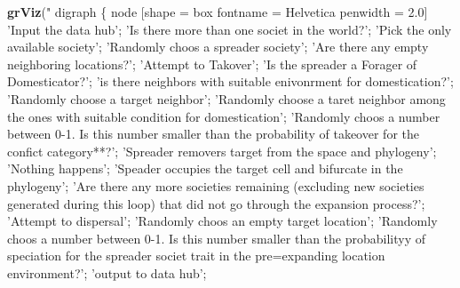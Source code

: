 \documentclass[]{book}
\newenvironment{Shaded}{\begin{snugshade}}{\end{snugshade}}
\newcommand{\KeywordTok}[1]{\textcolor[rgb]{0.13,0.29,0.53}{\textbf{{#1}}}}
\newcommand{\StringTok}[1]{\textcolor[rgb]{0.31,0.60,0.02}{{#1}}}
\newcommand{\NormalTok}[1]{{#1}}
\theoremstyle{definition}
\theoremstyle{definition}
\theoremstyle{remark}
\begin{document}
\begin{Shaded}
\begin{Highlighting}[]
\KeywordTok{grViz}\NormalTok{(}\StringTok{"}
\StringTok{  digraph \{}
\StringTok{    }
\StringTok{    node [shape = box}
\StringTok{          fontname = Helvetica}
\StringTok{          penwidth = 2.0]}
\StringTok{    'Input the data hub'; }
\StringTok{    'Is there more than one societ in the world?'; }
\StringTok{    'Pick the only available society';}
\StringTok{    'Randomly choos a spreader society';}
\StringTok{    'Are there any empty neighboring locations?';}
\StringTok{    'Attempt to Takover';}
\StringTok{    'Is the spreader a Forager of Domesticator?';}
\StringTok{    'is there neighbors with suitable enivonrment for domestication?';}
\StringTok{    'Randomly choose a target neighbor';}
\StringTok{    'Randomly choose a taret neighbor among the ones with suitable condition for domestication';}
\StringTok{    'Randomly choos a number between 0-1. Is this number smaller than the probability of takeover for the confict category**?';}
\StringTok{    'Spreader removers target from the space and phylogeny';}
\StringTok{    'Nothing happens';}
\StringTok{    'Speader occupies the target cell and bifurcate in the phylogeny';}
\StringTok{    'Are there any more societies remaining (excluding new societies generated during this loop) that did not go through the expansion process?';}
\StringTok{    'Attempt to dispersal';}
\StringTok{    'Randomly choos an empty target location';}
\StringTok{    'Randomly choos a number between 0-1. Is this number smaller than the probabilityy of speciation for the spreader societ trait in the pre=expanding location environment?';}
\StringTok{    'output to data hub';}


\end{Highlighting}
\end{Shaded}
\end{document}
